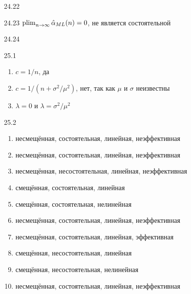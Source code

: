 \protect \hypertarget {soln:24.22}{}
\begin{solution}{{24.22}}
\end{solution}
\protect \hypertarget {soln:24.23}{}
\begin{solution}{{24.23}}
  $\operatorname*{plim}_{n\rightarrow\infty} \hat\alpha_{ML}(n) = 0$, не является состоятельной
\end{solution}
\protect \hypertarget {soln:24.24}{}
\begin{solution}{{24.24}}

\end{solution}
\protect \hypertarget {soln:25.1}{}
\begin{solution}{{25.1}}
    \begin{enumerate}
      \item $c=1/n$, да
      \item $c=1/(n+\sigma^2/\mu^2)$, нет, так как $\mu$ и $\sigma$ неизвестны
      \item $\lambda=0$ и $\lambda=\sigma^2/\mu^2$
    \end{enumerate}
  
\end{solution}
\protect \hypertarget {soln:25.2}{}
\begin{solution}{{25.2}}
    \begin{enumerate}
    \item несмещённая, состоятельная, линейная, неэффективная
    \item несмещённая, состоятельная, линейная, неэффективная
    \item несмещённая, несостоятельная, линейная, неэффективная
    \item смещённая, состоятельная, линейная
    \item смещённая, состоятельная, нелинейная
    \item несмещённая, состоятельная, линейная, неэффективная
    \item несмещённая, состоятельная, линейная, эффективная
    \item смещённая, несостоятельная, линейная
    \item смещённая, несостоятельная, нелинейная
    \item несмещённая, состоятельная, линейная, неэффективная
    \end{enumerate}
  
\end{solution}
\protect \hypertarget {soln:25.3}{}
